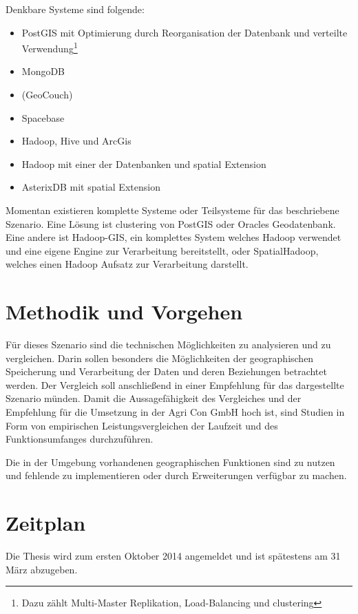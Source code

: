 \documentclass[
a4paper,     %
12pt         %
]{scrartcl}  %
\begin{document}
Denkbare Systeme sind folgende:
\begin{itemize}
\item PostGIS mit Optimierung durch Reorganisation der Datenbank und verteilte Verwendung\footnote{Dazu zählt Multi-Master Replikation, Load-Balancing und clustering}
\item MongoDB
\item (GeoCouch)
\item Spacebase
\item Hadoop, Hive und ArcGis
\item Hadoop mit einer der Datenbanken und spatial Extension
\item AsterixDB mit spatial Extension
\end{itemize}


Momentan existieren komplette Systeme oder Teilsysteme für das beschriebene Szenario.
Eine Lösung ist clustering von PostGIS oder Oracles Geodatenbank.
Eine andere ist Hadoop-GIS, ein komplettes System welches Hadoop verwendet und eine eigene Engine zur Verarbeitung bereitstellt, oder SpatialHadoop, welches einen Hadoop Aufsatz zur Verarbeitung darstellt.

\section{Methodik und Vorgehen}

Für dieses Szenario sind die technischen Möglichkeiten zu analysieren und zu vergleichen.
Darin sollen besonders die Möglichkeiten der geographischen Speicherung und Verarbeitung der Daten und deren Beziehungen betrachtet werden.
Der Vergleich soll anschließend in einer Empfehlung für das dargestellte Szenario münden.
Damit die Aussagefähigkeit des Vergleiches und der Empfehlung für die Umsetzung in der Agri Con GmbH hoch ist, sind Studien in Form von empirischen Leistungsvergleichen der Laufzeit und des Funktionsumfanges durchzuführen.

Die in der Umgebung vorhandenen geographischen Funktionen sind zu nutzen und fehlende zu implementieren oder durch Erweiterungen verfügbar zu machen.


\section{Zeitplan}

Die Thesis wird zum ersten Oktober 2014 angemeldet und ist spätestens am 31 März abzugeben.
\end{document}
